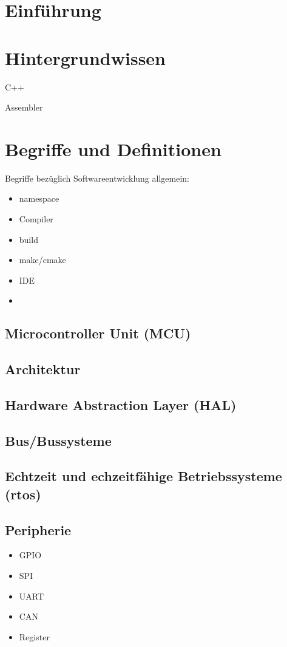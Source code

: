 \section{Einführung}



\section{Hintergrundwissen}
C++

Assembler


\section{Begriffe und Definitionen}
Begriffe bezüglich Softwareentwicklung allgemein:
\begin{itemize}
	\item namespace
	\item Compiler
	\item build
	\item make/cmake
	\item IDE
	\item 
\end{itemize}


\subsection*{Microcontroller Unit (MCU)}

\subsection*{Architektur}

\subsection*{Hardware Abstraction Layer (HAL)}

\subsection*{Bus/Bussysteme}

\subsection*{Echtzeit und echzeitfähige Betriebssysteme (\gls{rtos})}

\subsection*{Peripherie}
\begin{itemize}
	\item GPIO
	\item SPI
	\item UART
	\item CAN
	\item Register %
\end{itemize}

